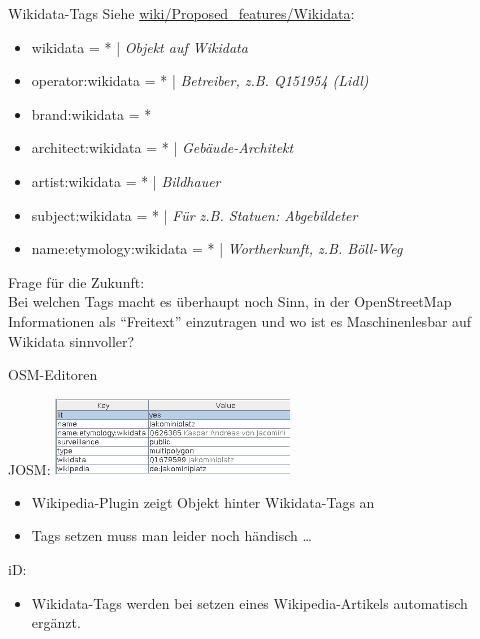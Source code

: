 \documentclass{beamer}
\begin{document}
\begin{frame}{Wikidata-Tags}
  Siehe \href{https://wiki.openstreetmap.org/wiki/Proposed\_features/Wikidata}{wiki/Proposed\_features/Wikidata}:
  \begin{itemize}
    \item wikidata = * | \emph{Objekt auf Wikidata} \pause
    \item operator:wikidata = * | \emph{Betreiber, z.B. Q151954 (Lidl) }
    \item brand:wikidata = * 
    \item architect:wikidata = * | \emph{Gebäude-Architekt}
    \item artist:wikidata = * | \emph{Bildhauer}
    \item subject:wikidata = * | \emph{Für z.B. Statuen: Abgebildeter}
    \item name:etymology:wikidata = * | \emph{Wortherkunft, z.B. Böll-Weg}
  \end{itemize}

  \pause
  Frage für die Zukunft: \\
  Bei welchen Tags macht es überhaupt noch Sinn, in der OpenStreetMap Informationen als "`Freitext"' einzutragen und wo ist es Maschinenlesbar auf Wikidata sinnvoller?

\end{frame}

\begin{frame}{OSM-Editoren}

  JOSM: \hfill \includegraphics[height=2cm]{jakominiplatz.png}

  \begin{itemize}
    \item Wikipedia-Plugin zeigt Objekt hinter Wikidata-Tags an 
    \item Tags setzen muss man leider noch händisch \dots
  \end{itemize}

  \pause
  iD:
  \begin{itemize}
    \item Wikidata-Tags werden bei setzen eines Wikipedia-Artikels automatisch ergänzt.
  \end{itemize}

\end{frame}
\end{document}
